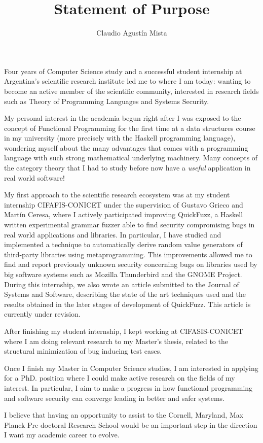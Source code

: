 \documentclass[helvetica,openbib,logo,notitle,flagCMYK,totpages]{europecv}
\title{Statement of Purpose}
\author{Claudio Agust\'in Mista}
\date{}
\begin{document}

\maketitle 
   
    Four years of Computer Science study and a successful student internship at
    Argentina's scientific research institute led me to where I am today:
    wanting to become an active member of the scientific community, interested
    in research fields such as Theory of Programming Languages and Systems
    Security. 

    My personal interest in the academia begun right after I was exposed to the
    concept of Functional Programming for the first time at a data structures
    course in my university (more precisely with the Haskell programming
    language), wondering myself about the many advantages that comes with a
    programming language with such strong mathematical underlying machinery.
    Many concepts of the category theory that I had to study before now have a
    \emph{useful} application in real world software! 

    My first approach to the scientific research ecosystem was at my student
    internship CIFAFIS-CONICET under the supervision of Gustavo Grieco and
    Mart\'in Ceresa, where I actively participated improving QuickFuzz, a
    Haskell written experimental grammar fuzzer able to find security
    compromising bugs in real world applications and libraries. In particular,
    I have studied and implemented a technique to automatically derive random
    value generators of third-party libraries using metaprogramming. This
    improvements allowed me to find and report previously unknown security
    concerning bugs on libraries used by big software systems such as Mozilla
    Thunderbird and the GNOME Project. During this internship, we also wrote an
    article submitted to the Journal of Systems and Software, describing the
    state of the art techniques used and the results obtained in the later
    stages of development of QuickFuzz. This article is currently under
    revision. 

    After finishing my student internship, I kept working at CIFASIS-CONICET
    where I am doing relevant research to my Master's thesis, related to the
    structural minimization of bug inducing test cases.   

    Once I finish my Master in Computer Science studies, I am interested in
    applying for a PhD. position where I could make active research on the
    fields of my interest. In particular, I aim to make a progress in how
    functional programming and software security can converge leading in better
    and safer systems. 

    I believe that having an opportunity to assist to the Cornell, Maryland,
    Max Planck Pre-doctoral Research School would be an important step in the
    direction I want my academic career to evolve.
\end{document}
